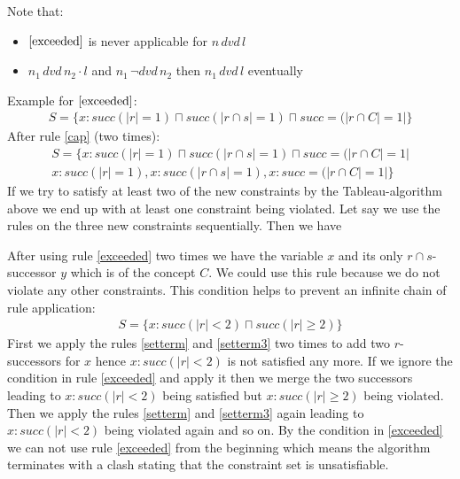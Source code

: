 \documentclass[a4paper,11pt]{scrartcl}
\theoremstyle{definition}
\begin{document}
Note that:
\begin{itemize}
\item $\ref{exceeded}$ is never applicable for $n\, dvd\, l$
\item $n_1\,dvd\,n_2\cdot l$ and $n_1\,\neg dvd\,n_2$ then $n_1\,dvd\,l$ eventually
\end{itemize}
Example for $\ref{exceeded}$:
\begin{align}
S=\{x:succ(|r|=1)\sqcap succ(|r\cap s|=1)\sqcap succ=(|r\cap C|=1|\}
\end{align}
After rule \ref{cap} (two times):
\begin{align*}
S=\{x:succ(|r|=1)\sqcap succ(|r\cap s|=1)\sqcap succ=(|r\cap C|=1|\\
x:succ(|r|=1), x:succ(|r\cap s|=1), x:succ=(|r\cap C|=1|
\}
\end{align*}
If we try to satisfy at least two of the new constraints by the Tableau-algorithm above we end up with at least one constraint being violated. Let say we use the rules on the three new constraints sequentially. Then we have 
\begin{figure}[H]
\centering
{}
\end{figure}
After using rule \ref{exceeded} two times we have the variable $x$ and its only $r\cap s$-successor $y$ which is of the concept $C$. We could use this rule because we do not violate any other constraints. This condition helps to prevent an infinite chain of rule application:
\begin{align}
S=\{x:succ(|r|<2)\sqcap succ(|r|\geq 2)\}	
\end{align}
First we apply the rules \ref{setterm} and \ref{setterm3} two times to add two $r$-successors for $x$ hence $x:succ(|r|<2)$ is not satisfied any more. If we ignore the condition in rule \ref{exceeded} and apply it then we merge the two successors leading to $x:succ(|r|<2)$ being satisfied but $x:succ(|r|\geq 2)$ being violated. Then we apply the rules \ref{setterm} and \ref{setterm3} again leading to $x:succ(|r|<2)$ being violated again and so on. By the condition in \ref{exceeded} we can not use rule \ref{exceeded} from the beginning which means the algorithm terminates with a clash stating that the constraint set is unsatisfiable.
\end{document}
